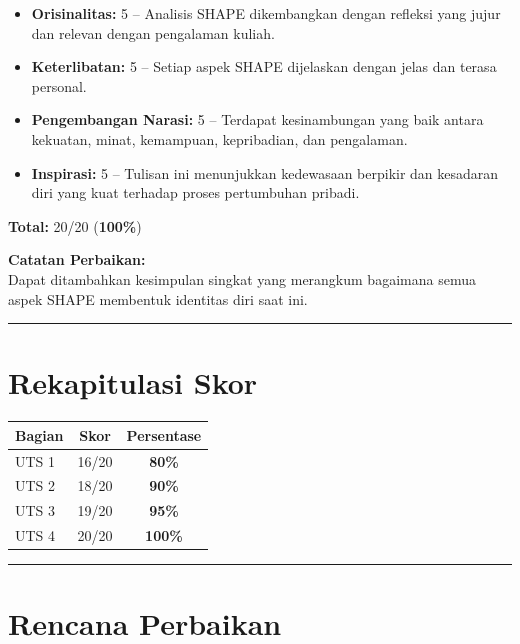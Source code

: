 \documentclass[
  letterpaper,
  DIV=11,
  numbers=noendperiod]{scrreprt}
\providecommand{\tightlist}{%
  \setlength{\itemsep}{0pt}\setlength{\parskip}{0pt}}
\begin{document}
\begin{itemize}
\tightlist
\item
  \textbf{Orisinalitas:} 5 -- Analisis SHAPE dikembangkan dengan
  refleksi yang jujur dan relevan dengan pengalaman kuliah.\\
\item
  \textbf{Keterlibatan:} 5 -- Setiap aspek SHAPE dijelaskan dengan jelas
  dan terasa personal.\\
\item
  \textbf{Pengembangan Narasi:} 5 -- Terdapat kesinambungan yang baik
  antara kekuatan, minat, kemampuan, kepribadian, dan pengalaman.\\
\item
  \textbf{Inspirasi:} 5 -- Tulisan ini menunjukkan kedewasaan berpikir
  dan kesadaran diri yang kuat terhadap proses pertumbuhan pribadi.
\end{itemize}

\textbf{Total:} 20/20 (\textbf{100\%})

\textbf{Catatan Perbaikan:}\\
Dapat ditambahkan kesimpulan singkat yang merangkum bagaimana semua
aspek SHAPE membentuk identitas diri saat ini.

\begin{center}\rule{0.5\linewidth}{0.5pt}\end{center}

\section{Rekapitulasi Skor}\label{rekapitulasi-skor}

\begin{longtable}[]{@{}lcc@{}}
\toprule\noalign{}
Bagian & Skor & Persentase \\
\midrule\noalign{}
\endhead
\bottomrule\noalign{}
\endlastfoot
UTS 1 & 16/20 & \textbf{80\%} \\
UTS 2 & 18/20 & \textbf{90\%} \\
UTS 3 & 19/20 & \textbf{95\%} \\
UTS 4 & 20/20 & \textbf{100\%} \\
\end{longtable}

\begin{center}\rule{0.5\linewidth}{0.5pt}\end{center}

\section{Rencana Perbaikan}\label{rencana-perbaikan}
\end{document}
